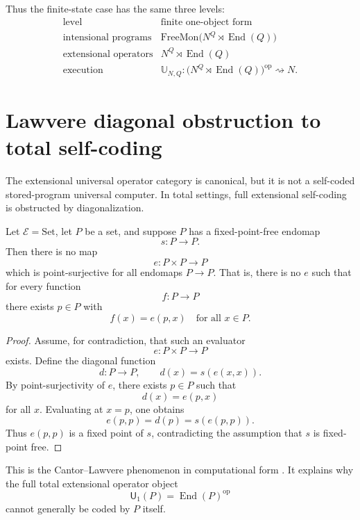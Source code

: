 Thus the finite-state case has the same three levels:
\[
\begin{array}{c|c}
\text{level} & \text{finite one-object form} \\ \hline
\text{intensional programs}
    & \mathrm{FreeMon}\bigl(N^Q\rtimes\operatorname{End}(Q)\bigr) \\
\text{extensional operators}
    & N^Q\rtimes\operatorname{End}(Q) \\
\text{execution}
    & \mathbb U_{N,Q}:
        \bigl(N^Q\rtimes\operatorname{End}(Q)\bigr)^{\operatorname{op}}
        \rightsquigarrow N .
\end{array}
\]

\section{Lawvere diagonal obstruction to total self-coding}
\label{sec:lawvere-diagonal-obstruction}

The extensional universal operator category is canonical, but it is not a self-coded
stored-program universal computer.  In total settings, full extensional self-coding is obstructed
by diagonalization.

\begin{theorem}
\label{thm:lawvere-diagonal-obstruction}
Let \(\mathcal E=\mathrm{Set}\), let \(P\) be a set, and suppose \(P\) has a fixed-point-free
endomap
\[
        s:P\longrightarrow P.
\]
Then there is no map
\[
        e:P\times P\longrightarrow P
\]
which is point-surjective for all endomaps \(P\to P\).  That is, there is no \(e\) such that for
every function
\[
        f:P\longrightarrow P
\]
there exists \(p\in P\) with
\[
        f(x)=e(p,x)
        \quad\text{for all }x\in P.
\]
\end{theorem}

\begin{proof}
Assume, for contradiction, that such an evaluator
\[
        e:P\times P\to P
\]
exists.  Define the diagonal function
\[
        d:P\to P,
        \qquad
        d(x)=s(e(x,x)).
\]
By point-surjectivity of \(e\), there exists \(p\in P\) such that
\[
        d(x)=e(p,x)
\]
for all \(x\).  Evaluating at \(x=p\), one obtains
\[
        e(p,p)=d(p)=s(e(p,p)).
\]
Thus \(e(p,p)\) is a fixed point of \(s\), contradicting the assumption that \(s\) is fixed-point
free.
\end{proof}

This is the Cantor--Lawvere phenomenon in computational form \cite{Lawvere1969}.  It explains why
the full total extensional operator object
\[
        \mathsf U_1(P)=\operatorname{End}(P)^{\operatorname{op}}
\]
cannot generally be coded by \(P\) itself.

